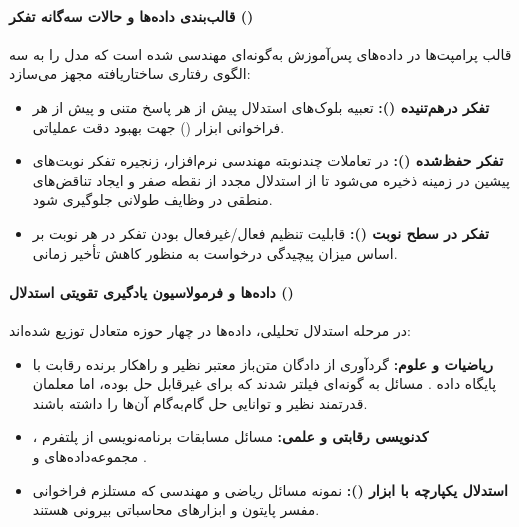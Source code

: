 \paragraph*{قالب‌بندی داده‌ها و حالات سه‌گانه تفکر ()}
قالب پرامپت‌ها در داده‌های پس‌آموزش به‌گونه‌ای مهندسی شده است که مدل را به سه الگوی رفتاری ساختاریافته مجهز می‌سازد:
\begin{itemize}
    \item \textbf{تفکر درهم‌تنیده ():} تعبیه بلوک‌های استدلال پیش از هر پاسخ متنی و پیش از هر فراخوانی ابزار () جهت بهبود دقت عملیاتی.
    \item \textbf{تفکر حفظ‌شده ():} در تعاملات چندنوبته مهندسی نرم‌افزار، زنجیره تفکر نوبت‌های پیشین در زمینه ذخیره می‌شود تا از استدلال مجدد از نقطه صفر و ایجاد تناقض‌های منطقی در وظایف طولانی جلوگیری شود.
    \item \textbf{تفکر در سطح نوبت ():} قابلیت تنظیم فعال/غیرفعال بودن تفکر در هر نوبت بر اساس میزان پیچیدگی درخواست به منظور کاهش تأخیر زمانی.
\end{itemize}

\paragraph*{داده‌ها و فرمولاسیون یادگیری تقویتی استدلال ()}
در مرحله استدلال تحلیلی، داده‌ها در چهار حوزه متعادل توزیع شده‌اند:
\begin{itemize}
    \item \textbf{ریاضیات و علوم:} گردآوری از دادگان متن‌باز معتبر نظیر  \cite{nemotronmath2025} و راهکار برنده رقابت  با پایگاه داده  \cite{moshkov2025aimo2}. مسائل به گونه‌ای فیلتر شدند که برای  غیرقابل حل بوده، اما معلمان قدرتمند نظیر  \cite{openai2025gpt52} و  \cite{deepmind2025gemini3} توانایی حل گام‌به‌گام آن‌ها را داشته باشند.
    \item \textbf{کدنویسی رقابتی و علمی:} مسائل مسابقات برنامه‌نویسی از پلتفرم ، مجموعه‌داده‌های  \cite{li2023taco} و  \cite{primeintellect2025synthetic2}.
    \item \textbf{استدلال یکپارچه با ابزار ():} نمونه مسائل ریاضی و مهندسی که مستلزم فراخوانی مفسر پایتون و ابزارهای محاسباتی بیرونی هستند.
\end{itemize}

